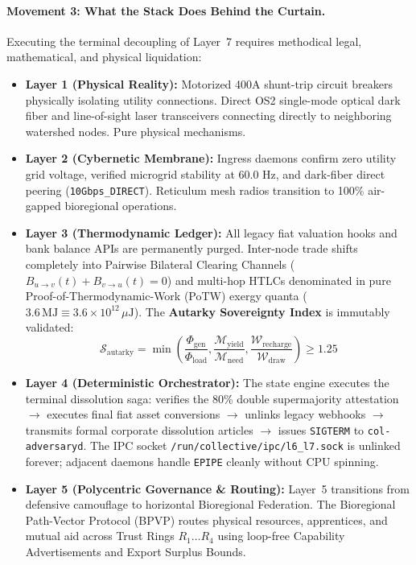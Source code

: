 \paragraph{Movement 3: What the Stack Does Behind the Curtain.}
Executing the terminal decoupling of Layer~7 requires methodical legal, mathematical, and physical liquidation:
\begin{itemize}
    \item \textbf{Layer 1 (Physical Reality):} Motorized 400A shunt-trip circuit breakers physically isolating utility connections. Direct OS2 single-mode optical dark fiber and line-of-sight laser transceivers connecting directly to neighboring watershed nodes. Pure physical mechanisms.
    \item \textbf{Layer 2 (Cybernetic Membrane):} Ingress daemons confirm zero utility grid voltage, verified microgrid stability at 60.0 Hz, and dark-fiber direct peering (\texttt{10Gbps\_DIRECT}). Reticulum mesh radios transition to 100\% air-gapped bioregional operations.
    \item \textbf{Layer 3 (Thermodynamic Ledger):} All legacy fiat valuation hooks and bank balance APIs are permanently purged. Inter-node trade shifts completely into Pairwise Bilateral Clearing Channels ($B_{u \to v}(t) + B_{v \to u}(t) = 0$) and multi-hop HTLCs denominated in pure Proof-of-Thermodynamic-Work (PoTW) exergy quanta ($3.6\,\mathrm{MJ} \equiv 3.6 \times 10^{12}\,\mu\mathrm{J}$). The \textbf{Autarky Sovereignty Index} is immutably validated:
    \[
    \mathcal{S}_{\mathrm{autarky}} = \min\left( \frac{\Phi_{\mathrm{gen}}}{\Phi_{\mathrm{load}}}, \frac{\mathcal{M}_{\mathrm{yield}}}{\mathcal{M}_{\mathrm{need}}}, \frac{\mathcal{W}_{\mathrm{recharge}}}{\mathcal{W}_{\mathrm{draw}}} \right) \ge 1.25
    \]
    \item \textbf{Layer 4 (Deterministic Orchestrator):} The state engine executes the terminal dissolution saga: verifies the 80\% double supermajority attestation $\to$ executes final fiat asset conversions $\to$ unlinks legacy webhooks $\to$ transmits formal corporate dissolution articles $\to$ issues \texttt{SIGTERM} to \texttt{col-adversaryd}. The IPC socket \texttt{/run/collective/ipc/l6\_l7.sock} is unlinked forever; adjacent daemons handle \texttt{EPIPE} cleanly without CPU spinning.
    \item \textbf{Layer 5 (Polycentric Governance \& Routing):} Layer~5 transitions from defensive camouflage to horizontal Bioregional Federation. The Bioregional Path-Vector Protocol (BPVP) routes physical resources, apprentices, and mutual aid across Trust Rings $R_1 \dots R_4$ using loop-free Capability Advertisements and Export Surplus Bounds.

\end{itemize}
